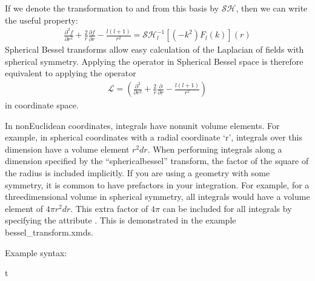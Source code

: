 \documentclass[letterpaper,10pt,english]{sphinxmanual}
\begin{document}
\sphinxAtStartPar
If we denote the transformation to and from this basis by \(\mathcal{SH}\), then we can write the useful property:
\begin{equation*}
\begin{split}\frac{\partial^2 f}{\partial r^2} +\frac{2}{r}\frac{\partial f}{\partial r} -\frac{l (l+1)}{r^2} = \mathcal{SH}^{-1}_l \left[(-k^2) F_l(k)\right](r)\end{split}
\end{equation*}
\sphinxAtStartPar
Spherical Bessel transforms allow easy calculation of the Laplacian of fields with spherical symmetry. Applying the operator  in Spherical Bessel space is therefore equivalent to applying the operator
\begin{equation*}
\begin{split}\mathcal{L} = \left( \frac{\partial^2}{\partial r^2} +\frac{2}{r}\frac{\partial}{\partial r} -\frac{l (l+1)}{r^2} \right)\end{split}
\end{equation*}
\sphinxAtStartPar
in coordinate space.

\sphinxAtStartPar
In non\sphinxhyphen{}Euclidean co\sphinxhyphen{}ordinates, integrals have non\sphinxhyphen{}unit volume elements.  For example, in spherical co\sphinxhyphen{}ordinates with a radial co\sphinxhyphen{}ordinate ‘r’, integrals over this dimension have a volume element \(r^2 dr\).  When performing integrals along a dimension specified by the “spherical\sphinxhyphen{}bessel” transform, the factor of the square of the radius is included implicitly.  If you are using a geometry with some symmetry, it is common to have prefactors in your integration.  For example, for a three\sphinxhyphen{}dimensional volume in spherical symmetry, all integrals would have a volume element of \(4\pi r^2 dr\).  This extra factor of \(4 \pi\) can be included for all integrals by specifying the attribute .  This is demonstrated in the example bessel\_transform.xmds.

\sphinxAtStartPar
Example syntax:

\begin{sphinxVerbatim}[commandchars=\\\{\}]
 
         t 
                  
\end{sphinxVerbatim}
\end{document}

